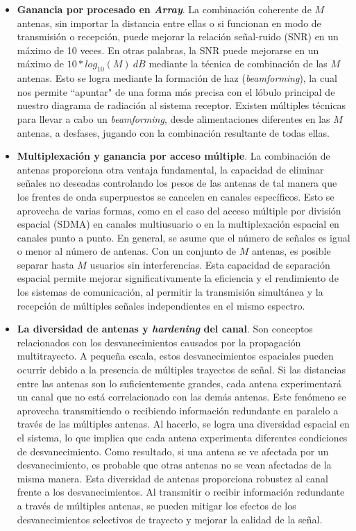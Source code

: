 \begin{itemize}
    \item \textbf{Ganancia por procesado en \textit{Array}}. La combinación coherente de $M$ antenas, sin importar la distancia entre ellas o si funcionan en modo de transmisión o recepción, puede mejorar la relación señal-ruido (SNR) en un máximo de 10 veces. En otras palabras, la SNR puede mejorarse en un máximo de $10*log_{10}(M)\:dB$ mediante la técnica de combinación de las $M$ antenas. Esto se logra mediante la formación de haz (\textit{beamforming}), la cual nos permite ``apuntar" de una forma más precisa con el lóbulo principal de nuestro diagrama de radiación al sistema receptor. Existen múltiples técnicas para llevar a cabo un \textit{beamforming}, desde alimentaciones diferentes en las $M$ antenas, a desfases, jugando con la combinación resultante de todas ellas.

    \item \textbf{Multiplexación y ganancia por acceso múltiple}. La combinación de antenas proporciona otra ventaja fundamental, la capacidad de eliminar señales no deseadas controlando los pesos de las antenas de tal manera que los frentes de onda superpuestos se cancelen en canales específicos. Esto se aprovecha de varias formas, como en el caso del acceso múltiple por división espacial (SDMA) en canales multiusuario o en la multiplexación espacial en canales punto a punto. En general, se asume que el número de señales es igual o menor al número de antenas. Con un conjunto de $M$ antenas, es posible separar hasta $M$ usuarios sin interferencias. Esta capacidad de separación espacial permite mejorar significativamente la eficiencia y el rendimiento de los sistemas de comunicación, al permitir la transmisión simultánea y la recepción de múltiples señales independientes en el mismo espectro.

    \item   \textbf{La diversidad de antenas y \textit{hardening} del canal}. Son conceptos relacionados con los desvanecimientos causados por la propagación multitrayecto. A pequeña escala, estos desvanecimientos espaciales pueden ocurrir debido a la presencia de múltiples trayectos de señal. Si las distancias entre las antenas son lo suficientemente grandes, cada antena experimentará un canal que no está correlacionado con las demás antenas. Este fenómeno se aprovecha transmitiendo o recibiendo información redundante en paralelo a través de las múltiples antenas. Al hacerlo, se logra una diversidad espacial en el sistema, lo que implica que cada antena experimenta diferentes condiciones de desvanecimiento. Como resultado, si una antena se ve afectada por un desvanecimiento, es probable que otras antenas no se vean afectadas de la misma manera. Esta diversidad de antenas proporciona robustez al canal frente a los desvanecimientos. Al transmitir o recibir información redundante a través de múltiples antenas, se pueden mitigar los efectos de los desvanecimientos selectivos de trayecto y mejorar la calidad de la señal.
\end{itemize}

